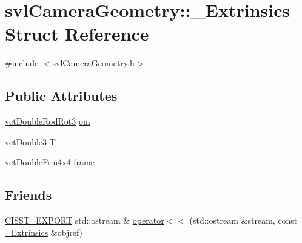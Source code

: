 \hypertarget{structsvl_camera_geometry_1_1___extrinsics}{\section{svl\-Camera\-Geometry\-:\-:\-\_\-\-Extrinsics Struct Reference}
\label{structsvl_camera_geometry_1_1___extrinsics}
}


{\ttfamily \#include $<$svl\-Camera\-Geometry.\-h$>$}

\subsection*{Public Attributes}
\begin{DoxyCompactItemize}
\item 
\hyperlink{vct_transformation_types_8h_a350d1047878839beb9dd36107516bd75}{vct\-Double\-Rod\-Rot3} \hyperlink{structsvl_camera_geometry_1_1___extrinsics_afeaca93a0c8c4b674c81a785b3aeda35}{om}
\item 
\hyperlink{vct_fixed_size_vector_types_8h_a4a89122c9d7f72c3f31fe8126e17c3af}{vct\-Double3} \hyperlink{structsvl_camera_geometry_1_1___extrinsics_aa41edbc90833a086ff1fff5c11fa7eb8}{T}
\item 
\hyperlink{vct_transformation_types_8h_ac7626dd8caf0095c4a1b427918c0f3b8}{vct\-Double\-Frm4x4} \hyperlink{structsvl_camera_geometry_1_1___extrinsics_a5cfad30329c5074e76e57eaf85b4737f}{frame}
\end{DoxyCompactItemize}
\subsection*{Friends}
\begin{DoxyCompactItemize}
\item 
\hyperlink{cmn_export_macros_8h_a99393e0c3ac434b2605235bbe20684f8}{C\-I\-S\-S\-T\-\_\-\-E\-X\-P\-O\-R\-T} std\-::ostream \& \hyperlink{structsvl_camera_geometry_1_1___extrinsics_a642ead17aecfba14ae8680b67ffedfca}{operator$<$$<$} (std\-::ostream \&stream, const \hyperlink{structsvl_camera_geometry_1_1___extrinsics}{\-\_\-\-Extrinsics} \&objref)
\end{DoxyCompactItemize}



